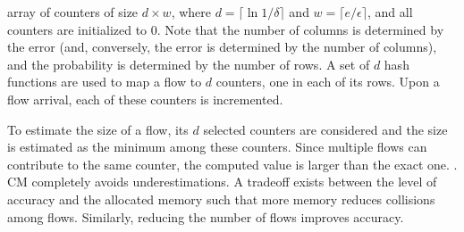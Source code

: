  array of counters of size $d \times w$, where $d = \lceil \ln{1 / \delta}\rceil$ and $w=\lceil e / \epsilon \rceil$, and all counters are initialized to 0. Note that the number of columns is determined by the error (and, conversely, the error is determined by the number of columns), and the probability is determined by the number of rows.
A set of $d$ hash functions are used to map a flow to $d$ counters, one in each of its rows. 
Upon a flow arrival, each of these counters is incremented.

To estimate the size of a flow, its $d$ selected counters are considered and the size is estimated as the minimum among these counters. Since multiple flows can contribute to the same counter, the computed value is  larger than the exact one. . 
CM completely avoids underestimations. A tradeoff exists between the level of accuracy and the allocated memory such that more memory reduces collisions among flows. Similarly, reducing the number of flows improves accuracy.

 



